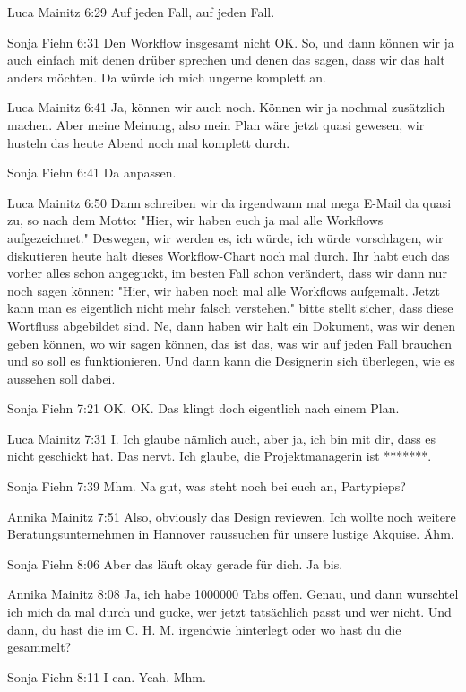 Luca Mainitz   6:29
Auf jeden Fall, auf jeden Fall.

Sonja Fiehn   6:31
Den Workflow insgesamt nicht OK. So, und dann können wir ja auch einfach mit denen drüber sprechen und denen das sagen, dass wir das halt anders möchten. Da würde ich mich ungerne komplett an.

Luca Mainitz   6:41
Ja, können wir auch noch. Können wir ja nochmal zusätzlich machen. Aber meine Meinung, also mein Plan wäre jetzt quasi gewesen, wir husteln das heute Abend noch mal komplett durch.

Sonja Fiehn   6:41
Da anpassen.

Luca Mainitz   6:50
Dann schreiben wir da irgendwann mal mega E-Mail da quasi zu, so nach dem Motto: "Hier, wir haben euch ja mal alle Workflows aufgezeichnet." Deswegen, wir werden es, ich würde, ich würde vorschlagen, wir diskutieren heute halt dieses Workflow-Chart noch mal durch. Ihr habt euch das vorher alles schon angeguckt, im besten Fall schon verändert, dass wir dann nur noch sagen können: "Hier, wir haben noch mal alle Workflows aufgemalt. Jetzt kann man es eigentlich nicht mehr falsch verstehen."
bitte stellt sicher, dass diese Wortfluss abgebildet sind. Ne, dann haben wir halt ein Dokument, was wir denen geben können, wo wir sagen können, das ist das, was wir auf jeden Fall brauchen und so soll es funktionieren. Und dann kann die Designerin sich überlegen, wie es aussehen soll dabei.

Sonja Fiehn   7:21
OK.
OK.
Das klingt doch eigentlich nach einem Plan.

Luca Mainitz   7:31
I.
Ich glaube nämlich auch, aber ja, ich bin mit dir, dass es nicht geschickt hat. Das nervt. Ich glaube, die Projektmanagerin ist *******.

Sonja Fiehn   7:39
Mhm.
Na gut, was steht noch bei euch an, Partypieps?

Annika Mainitz   7:51
Also, obviously das Design reviewen. Ich wollte noch weitere Beratungsunternehmen in Hannover raussuchen für unsere lustige Akquise.
Ähm.

Sonja Fiehn   8:06
Aber das läuft okay gerade für dich. Ja bis.

Annika Mainitz   8:08
Ja, ich habe 1000000 Tabs offen. Genau, und dann wurschtel ich mich da mal durch und gucke, wer jetzt tatsächlich passt und wer nicht. Und dann, du hast die im C. H. M. irgendwie hinterlegt oder wo hast du die gesammelt?

Sonja Fiehn   8:11
I can.
Yeah.
Mhm.

